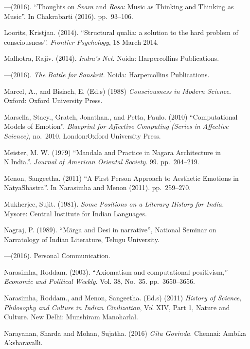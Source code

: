\begin{thebibliography}{99}
---\kern3pt(2016). “Thoughts on \textsl{Svara} and \textsl{Rasa}: Music as Thinking and Thinking as Music”. In Chakrabarti (2016). pp.~93--106.

Loorits, Kristjan. (2014). “Structural qualia: a solution to the hard problem of consciousness”. \textsl{Frontier Psychology}, 18 March 2014.

Malhotra, Rajiv. (2014). \textsl{Indra’s Net}. Noida: Harpercollins Publications.

---\kern3pt(2016). \textsl{The Battle for Sanskrit}. Noida: Harpercollins Publications.

Marcel, A., and Bisiach, E. (Ed.s) (1988) \textsl{Consciousness in Modern Science}. Oxford: Oxford University Press.

Marsella, Stacy., Gratch, Jonathan., and Petta, Paulo. (2010) “Computational Models of Emotion”. \textsl{Blueprint for Affective Computing (Series in Affective Science)}, no.~2010. London:Oxford University Press.

Meister, M. W. (1979) “Mandala and Practice in Nagara Architecture in N.India.”. \textsl{Journal of American Oriental Society}. 99. pp.~204--219.

Menon, Sangeetha. (2011) “A First Person Approach to Aesthetic Emotions in NātyaShāstra”. In Narasimha and Menon (2011). pp.~259--270.

Mukherjee, Sujit. (1981). \textsl{Some Positions on a Literary History for India.} Mysore: Central Institute for Indian Languages.

Nagraj, P. (1989). “Mārga and Desi in narrative”, National Seminar on Narratology of Indian Literature, Telugu University.

---\kern3pt(2016). Personal Communication.

Narasimha, Roddam. (2003). “Axiomatism and computational positivism,” \textsl{Economic and Political Weekly}. Vol. 38, No.~35. pp.~3650--3656.

Narasimha, Roddam., and Menon, Sangeetha. (Ed.s) (2011) \textsl{History of Science, Philosophy and Culture in Indian Civilization}, Vol XIV, Part 1, Nature and Culture. New Delhi: Munshiram Manoharlal.

Narayanan, Sharda and Mohan, Sujatha. (2016) \textsl{Gīta Govinda}. Chennai: Ambika Aksharavalli.


\end{thebibliography}
